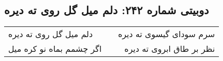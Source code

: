 \begin{center}
\section*{دوبیتی شماره ۲۴۲: دلم میل گل روی ته دیره}
\label{sec:242}
\begin{longtable}{l p{0.5cm} r}
دلم میل گل روی ته دیره
&&
سرم سودای گیسوی ته دیره
\\
اگر چشمم بماه نو کره میل
&&
نظر بر طاق ابروی ته دیره
\\
\end{longtable}
\end{center}
